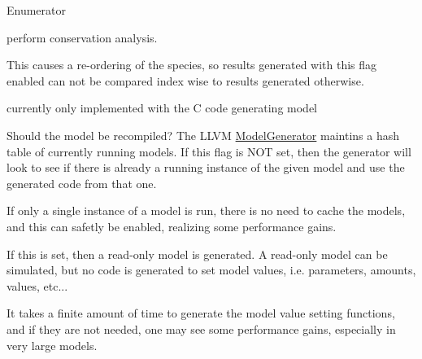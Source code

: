 \begin{Desc}
\item[Enumerator]\par
\begin{description}
\item[{\em 
\hypertarget{structrr_1_1_load_s_b_m_l_options_a7b6ca6fc32892dbe782f3eb718762ad6ac12b0c238ca339af0f901dd2c0cd1494}{Conservation\-Analysis}\label{structrr_1_1_load_s_b_m_l_options_a7b6ca6fc32892dbe782f3eb718762ad6ac12b0c238ca339af0f901dd2c0cd1494}
}]perform conservation analysis.

This causes a re-\/ordering of the species, so results generated with this flag enabled can not be compared index wise to results generated otherwise.

currently only implemented with the C code generating model \item[{\em 
\hypertarget{structrr_1_1_load_s_b_m_l_options_a7b6ca6fc32892dbe782f3eb718762ad6a6cf3ca3062d41e95ad0e66989aff2326}{Force\-Re\-Compile}\label{structrr_1_1_load_s_b_m_l_options_a7b6ca6fc32892dbe782f3eb718762ad6a6cf3ca3062d41e95ad0e66989aff2326}
}]Should the model be recompiled? The L\-L\-V\-M \hyperlink{classrr_1_1_model_generator}{Model\-Generator} maintins a hash table of currently running models. If this flag is N\-O\-T set, then the generator will look to see if there is already a running instance of the given model and use the generated code from that one.

If only a single instance of a model is run, there is no need to cache the models, and this can safetly be enabled, realizing some performance gains. \item[{\em 
\hypertarget{structrr_1_1_load_s_b_m_l_options_a7b6ca6fc32892dbe782f3eb718762ad6a41b09f904405a3481688faa484f0f318}{Read\-Only\-Model}\label{structrr_1_1_load_s_b_m_l_options_a7b6ca6fc32892dbe782f3eb718762ad6a41b09f904405a3481688faa484f0f318}
}]If this is set, then a read-\/only model is generated. A read-\/only model can be simulated, but no code is generated to set model values, i.\-e. parameters, amounts, values, etc...

It takes a finite amount of time to generate the model value setting functions, and if they are not needed, one may see some performance gains, especially in very large models. \end{description}
\end{Desc}


